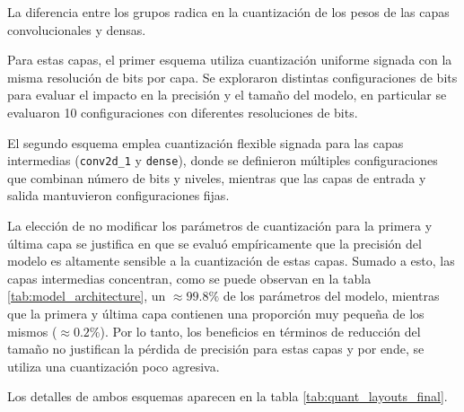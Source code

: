 La diferencia entre los grupos radica en la cuantización de los pesos de las capas convolucionales y densas.

Para estas capas, el primer esquema utiliza cuantización uniforme signada con la misma resolución de bits por capa. Se exploraron distintas configuraciones de bits para evaluar el impacto en la precisión y el tamaño del modelo, en particular se evaluaron 10 configuraciones con diferentes resoluciones de bits.

El segundo esquema emplea cuantización flexible signada para las capas intermedias (\texttt{conv2d\_1} y \texttt{dense}), donde se definieron múltiples configuraciones que combinan número de bits y niveles, mientras que las capas de entrada y salida mantuvieron configuraciones fijas.

La elección de no modificar los parámetros de cuantización para la primera y última capa se justifica en que se evaluó empíricamente que la precisión del modelo es altamente sensible a la cuantización de estas capas. Sumado a esto, las capas intermedias concentran, como se puede observan en la tabla \ref{tab:model_architecture}, un $\approx 99.8\%$ de los parámetros del modelo, mientras que la primera y última capa contienen una proporción muy pequeña de los mismos ($\approx 0.2\%$). Por lo tanto, los beneficios en términos de reducción del tamaño no justifican la pérdida de precisión para estas capas y por ende, se utiliza una cuantización poco agresiva.

Los detalles de ambos esquemas aparecen en la tabla \ref{tab:quant_layouts_final}.

